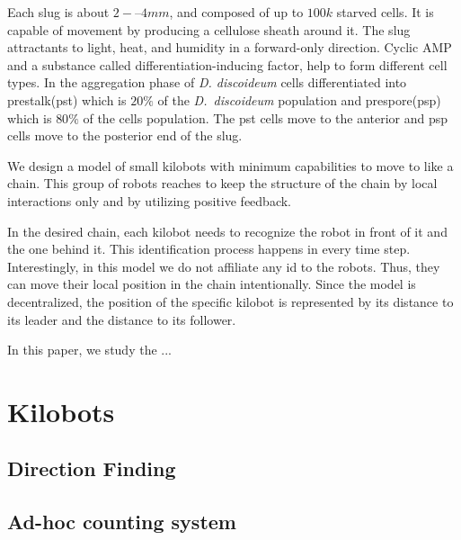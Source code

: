 \documentclass[11pt,a4paper]{article}
\begin{document}
Each slug is about $2-–4 mm$, and composed of up to $100k$ starved cells. It is capable of movement by producing a cellulose sheath around it. The slug attractants to light, heat, and humidity in a forward-only direction. Cyclic AMP and a substance called differentiation-inducing factor, help to form different cell types. In the aggregation phase of \textit{D. discoideum} cells differentiated into prestalk(pst) which is $20\%$ of the \textit{D.~discoideum} population and prespore(psp) which is $80\%$ of the cells population. The pst cells move to the anterior and psp cells move to the posterior end of the slug.

We design a model of small kilobots with minimum capabilities to move to like a chain. This group of robots reaches to keep the structure of the chain by local interactions only and by utilizing positive feedback.  

In the desired chain, each kilobot needs to recognize the robot in front of it and the one behind it. This identification process happens in every time step. Interestingly, in this model we do not affiliate any id to the robots. Thus, they can move their local position in the chain intentionally. Since the model is decentralized, the position of the specific kilobot is represented by its distance to its leader and the distance to its follower. 

In this paper, we study the ...
\section {Kilobots} 
\subsection{Direction Finding}
\subsection{Ad-hoc counting system}
\end{document}

